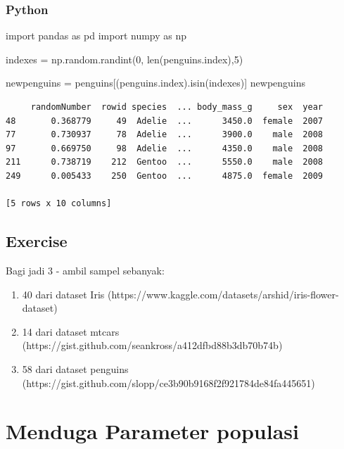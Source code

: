 \documentclass[
  letterpaper,
  DIV=11,
  numbers=noendperiod]{scrreprt}
\newenvironment{Shaded}{\begin{snugshade}}{\end{snugshade}}
\newcommand{\BuiltInTok}[1]{\textcolor[rgb]{0.00,0.23,0.31}{#1}}
\newcommand{\DecValTok}[1]{\textcolor[rgb]{0.68,0.00,0.00}{#1}}
\newcommand{\ImportTok}[1]{\textcolor[rgb]{0.00,0.46,0.62}{#1}}
\newcommand{\NormalTok}[1]{\textcolor[rgb]{0.00,0.23,0.31}{#1}}
\newcommand{\OperatorTok}[1]{\textcolor[rgb]{0.37,0.37,0.37}{#1}}
\providecommand{\tightlist}{%
  \setlength{\itemsep}{0pt}\setlength{\parskip}{0pt}}\usepackage{longtable,booktabs,array}
\begin{document}
\hypertarget{python-4}{%
\subsubsection{Python}\label{python-4}}

\begin{Shaded}
\begin{Highlighting}[]
\ImportTok{import}\NormalTok{ pandas }\ImportTok{as}\NormalTok{ pd}
\ImportTok{import}\NormalTok{ numpy }\ImportTok{as}\NormalTok{ np}

\NormalTok{indexes }\OperatorTok{=}\NormalTok{ np.random.randint(}\DecValTok{0}\NormalTok{, }\BuiltInTok{len}\NormalTok{(penguins.index),}\DecValTok{5}\NormalTok{)}

\NormalTok{newpenguins }\OperatorTok{=}\NormalTok{ penguins[(penguins.index).isin(indexes)]}
\NormalTok{newpenguins}
\end{Highlighting}
\end{Shaded}

\begin{verbatim}
     randomNumber  rowid species  ... body_mass_g     sex  year
48       0.368779     49  Adelie  ...      3450.0  female  2007
77       0.730937     78  Adelie  ...      3900.0    male  2008
97       0.669750     98  Adelie  ...      4350.0    male  2008
211      0.738719    212  Gentoo  ...      5550.0    male  2008
249      0.005433    250  Gentoo  ...      4875.0  female  2009

[5 rows x 10 columns]
\end{verbatim}

\hypertarget{exercise-2}{%
\subsection{Exercise}\label{exercise-2}}

Bagi jadi 3 - ambil sampel sebanyak:

\begin{enumerate}
\def\labelenumi{\arabic{enumi}.}
\tightlist
\item
  40 dari dataset Iris
  (https://www.kaggle.com/datasets/arshid/iris-flower-dataset)
\item
  14 dari dataset mtcars
  (https://gist.github.com/seankross/a412dfbd88b3db70b74b)
\item
  58 dari dataset penguins
  (https://gist.github.com/slopp/ce3b90b9168f2f921784de84fa445651)
\end{enumerate}

\hypertarget{menduga-parameter-populasi}{%
\section{Menduga Parameter populasi}\label{menduga-parameter-populasi}}
\end{document}
